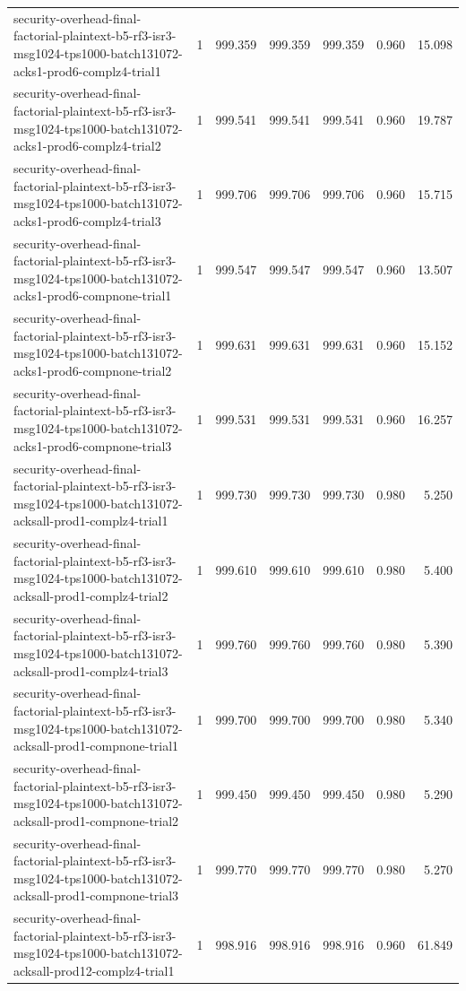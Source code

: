\begin{tabular}{lrrrrrr}
security-overhead-final-factorial-plaintext-b5-rf3-isr3-msg1024-tps1000-batch131072-acks1-prod6-complz4-trial1 & 1 & 999.359 & 999.359 & 999.359 & 0.960 & 15.098 \\
security-overhead-final-factorial-plaintext-b5-rf3-isr3-msg1024-tps1000-batch131072-acks1-prod6-complz4-trial2 & 1 & 999.541 & 999.541 & 999.541 & 0.960 & 19.787 \\
security-overhead-final-factorial-plaintext-b5-rf3-isr3-msg1024-tps1000-batch131072-acks1-prod6-complz4-trial3 & 1 & 999.706 & 999.706 & 999.706 & 0.960 & 15.715 \\
security-overhead-final-factorial-plaintext-b5-rf3-isr3-msg1024-tps1000-batch131072-acks1-prod6-compnone-trial1 & 1 & 999.547 & 999.547 & 999.547 & 0.960 & 13.507 \\
security-overhead-final-factorial-plaintext-b5-rf3-isr3-msg1024-tps1000-batch131072-acks1-prod6-compnone-trial2 & 1 & 999.631 & 999.631 & 999.631 & 0.960 & 15.152 \\
security-overhead-final-factorial-plaintext-b5-rf3-isr3-msg1024-tps1000-batch131072-acks1-prod6-compnone-trial3 & 1 & 999.531 & 999.531 & 999.531 & 0.960 & 16.257 \\
security-overhead-final-factorial-plaintext-b5-rf3-isr3-msg1024-tps1000-batch131072-acksall-prod1-complz4-trial1 & 1 & 999.730 & 999.730 & 999.730 & 0.980 & 5.250 \\
security-overhead-final-factorial-plaintext-b5-rf3-isr3-msg1024-tps1000-batch131072-acksall-prod1-complz4-trial2 & 1 & 999.610 & 999.610 & 999.610 & 0.980 & 5.400 \\
security-overhead-final-factorial-plaintext-b5-rf3-isr3-msg1024-tps1000-batch131072-acksall-prod1-complz4-trial3 & 1 & 999.760 & 999.760 & 999.760 & 0.980 & 5.390 \\
security-overhead-final-factorial-plaintext-b5-rf3-isr3-msg1024-tps1000-batch131072-acksall-prod1-compnone-trial1 & 1 & 999.700 & 999.700 & 999.700 & 0.980 & 5.340 \\
security-overhead-final-factorial-plaintext-b5-rf3-isr3-msg1024-tps1000-batch131072-acksall-prod1-compnone-trial2 & 1 & 999.450 & 999.450 & 999.450 & 0.980 & 5.290 \\
security-overhead-final-factorial-plaintext-b5-rf3-isr3-msg1024-tps1000-batch131072-acksall-prod1-compnone-trial3 & 1 & 999.770 & 999.770 & 999.770 & 0.980 & 5.270 \\
security-overhead-final-factorial-plaintext-b5-rf3-isr3-msg1024-tps1000-batch131072-acksall-prod12-complz4-trial1 & 1 & 998.916 & 998.916 & 998.916 & 0.960 & 61.849 \\

\end{tabular}
